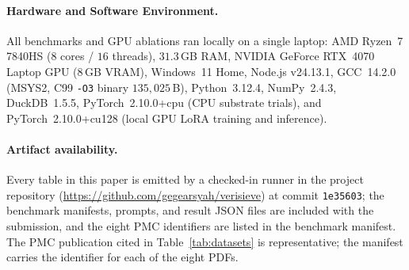\documentclass{article}
\begin{document}
\begin{table}[t]
\caption{Public benchmark corpus ($1{,}207$ documents; $826$ unsafe, $381$ safe under format-validated labeling).}
\label{tab:datasets}
\vskip 0.08in
\begin{center}
\end{center}
\vskip -0.14in
\end{table}

\paragraph{Hardware and Software Environment.}
All benchmarks and GPU ablations ran locally on a single laptop: AMD Ryzen~7 7840HS ($8$ cores / $16$ threads), $31.3$\,GB RAM, NVIDIA GeForce RTX~4070 Laptop GPU ($8$\,GB VRAM), Windows~11 Home, Node.js v24.13.1, GCC~14.2.0 (MSYS2, C99 \texttt{-O3} binary $135{,}025$\,B), Python~3.12.4, NumPy~2.4.3, DuckDB~1.5.5, PyTorch~2.10.0+cpu (CPU substrate trials), and PyTorch~2.10.0+cu128 (local GPU LoRA training and inference).

\paragraph{Artifact availability.}
Every table in this paper is emitted by a checked-in runner in the project repository (\url{https://github.com/gegearsyah/verisieve}) at commit \texttt{1e35603}; the benchmark manifests, prompts, and result JSON files are included with the submission, and the eight PMC identifiers are listed in the benchmark manifest. The PMC publication cited in Table~\ref{tab:datasets} is representative; the manifest carries the identifier for each of the eight PDFs.
\end{document}
